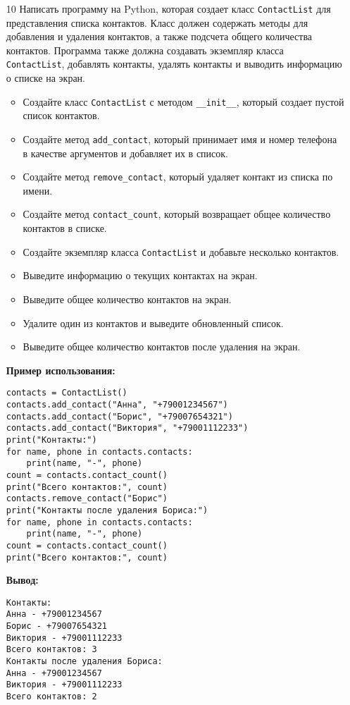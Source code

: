 \begin{enumerate}
\item[10] Написать программу на Python, которая создает класс \texttt{ContactList} для представления списка контактов. Класс должен содержать методы для добавления и удаления контактов, а также подсчета общего количества контактов. Программа также должна создавать экземпляр класса \texttt{ContactList}, добавлять контакты, удалять контакты и выводить информацию о списке на экран.

\begin{itemize}
    \item Создайте класс \texttt{ContactList} с методом \texttt{\_\_init\_\_}, который создает пустой список контактов.
    \item Создайте метод \texttt{add\_contact}, который принимает имя и номер телефона в качестве аргументов и добавляет их в список.
    \item Создайте метод \texttt{remove\_contact}, который удаляет контакт из списка по имени.
    \item Создайте метод \texttt{contact\_count}, который возвращает общее количество контактов в списке.
    \item Создайте экземпляр класса \texttt{ContactList} и добавьте несколько контактов.
    \item Выведите информацию о текущих контактах на экран.
    \item Выведите общее количество контактов на экран.
    \item Удалите один из контактов и выведите обновленный список.
    \item Выведите общее количество контактов после удаления на экран.
\end{itemize}

\textbf{Пример использования:}

\begin{verbatim}
contacts = ContactList()
contacts.add_contact("Анна", "+79001234567")
contacts.add_contact("Борис", "+79007654321")
contacts.add_contact("Виктория", "+79001112233")
print("Контакты:")
for name, phone in contacts.contacts:
    print(name, "-", phone)
count = contacts.contact_count()
print("Всего контактов:", count)
contacts.remove_contact("Борис")
print("Контакты после удаления Бориса:")
for name, phone in contacts.contacts:
    print(name, "-", phone)
count = contacts.contact_count()
print("Всего контактов:", count)
\end{verbatim}

\textbf{Вывод:}
\begin{verbatim}
Контакты:
Анна - +79001234567
Борис - +79007654321
Виктория - +79001112233
Всего контактов: 3
Контакты после удаления Бориса:
Анна - +79001234567
Виктория - +79001112233
Всего контактов: 2
\end{verbatim}


\end{enumerate}
